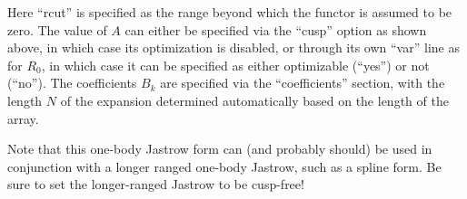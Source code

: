 Here ``rcut'' is specified as the range beyond which the functor is assumed to be zero.
The value of $A$ can either be specified via the ``cusp'' option as shown above, in
which case its optimization is disabled, or through its own ``var'' line as
for $R_0$, in which case it can be specified as either optimizable (``yes'')
or not (``no'').
The coefficients $B_k$ are specified via the ``coefficients'' section,
with the length $N$ of the expansion determined automatically based on the length
of the array.

Note that this one-body Jastrow form can (and probably should) be used in conjunction
with a longer ranged one-body Jastrow, such as a spline form.
Be sure to set the longer-ranged Jastrow to be cusp-free!
